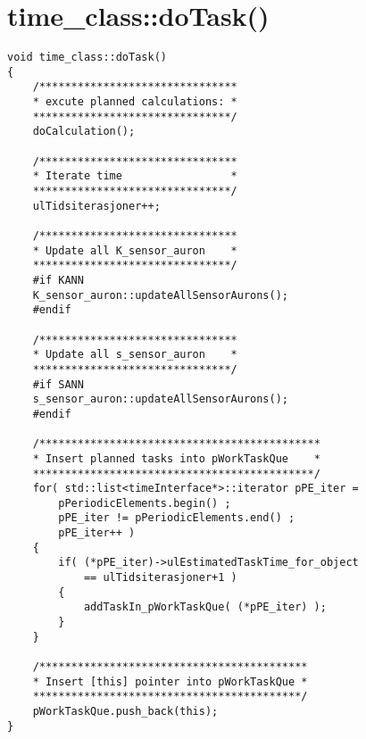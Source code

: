 \section{time\_class::doTask()}
\label{appendixTimeClassDoTask}
\begin{lstlisting}
void time_class::doTask()
{
	/*******************************
	* excute planned calculations: *
	*******************************/
	doCalculation();

	/*******************************
	* Iterate time 				   *
	*******************************/
	ulTidsiterasjoner++;

	/*******************************
	* Update all K_sensor_auron    *
	*******************************/
	#if KANN
	K_sensor_auron::updateAllSensorAurons();
	#endif

	/*******************************
	* Update all s_sensor_auron    *
	*******************************/
	#if SANN
	s_sensor_auron::updateAllSensorAurons();
	#endif

	/********************************************
	* Insert planned tasks into pWorkTaskQue    *
	********************************************/
	for( std::list<timeInterface*>::iterator pPE_iter = 
		pPeriodicElements.begin() ; 
		pPE_iter != pPeriodicElements.end()	; 
		pPE_iter++ )
	{
		if( (*pPE_iter)->ulEstimatedTaskTime_for_object 
			== ulTidsiterasjoner+1 )
		{
			addTaskIn_pWorkTaskQue( (*pPE_iter) );
		}
 	}

	/******************************************
	* Insert [this] pointer into pWorkTaskQue *
	******************************************/
	pWorkTaskQue.push_back(this);	
}
\end{lstlisting}
